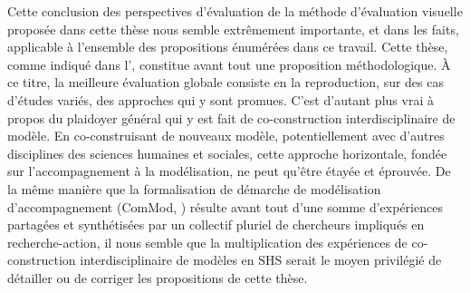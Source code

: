 Cette \og conclusion\fg{} des perspectives d'évaluation de la méthode d'évaluation visuelle proposée dans cette thèse nous semble extrêmement importante, et dans les faits, applicable à l'ensemble des propositions énumérées dans ce travail.
Cette thèse, comme indiqué dans l'\lowercase{}, constitue avant tout une proposition méthodologique.
À ce titre, la meilleure évaluation globale consiste en la reproduction, sur des cas d'études variés, des approches qui y sont promues.
C'est d'autant plus vrai à propos du plaidoyer général qui y est fait de co-construction interdisciplinaire de modèle.
En co-construisant de nouveaux modèle, potentiellement avec d'autres disciplines des sciences humaines et sociales, cette approche horizontale, fondée sur l'accompagnement à la modélisation, ne peut qu'être étayée et éprouvée.
De la même manière que la formalisation de démarche de modélisation d'accompagnement (ComMod, \cite{commod_modelisation_2005}) résulte avant tout d'une somme d'expériences partagées et synthétisées par un collectif pluriel de chercheurs impliqués en recherche-action, il nous semble que la multiplication des expériences de co-construction interdisciplinaire de modèles en SHS serait le moyen privilégié de détailler ou de corriger les propositions de cette thèse.

